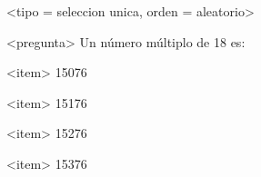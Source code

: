 <tipo = seleccion unica, orden = aleatorio>

<pregunta>
Un número múltiplo de 18 es:

<item>
15076

<item>
15176

<item>
15276

<item>
15376

